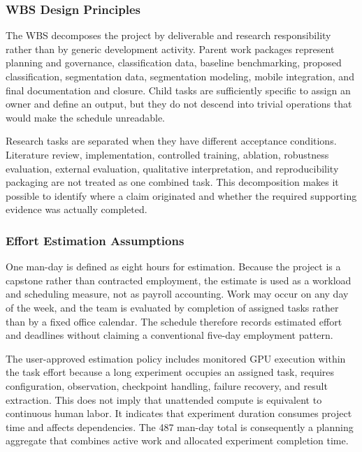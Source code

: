\subsubsection{WBS Design Principles}
The WBS decomposes the project by deliverable and research responsibility rather than by generic development activity. Parent work packages represent planning and governance, classification data, baseline benchmarking, proposed classification, segmentation data, segmentation modeling, mobile integration, and final documentation and closure. Child tasks are sufficiently specific to assign an owner and define an output, but they do not descend into trivial operations that would make the schedule unreadable.\par
Research tasks are separated when they have different acceptance conditions. Literature review, implementation, controlled training, ablation, robustness evaluation, external evaluation, qualitative interpretation, and reproducibility packaging are not treated as one combined task. This decomposition makes it possible to identify where a claim originated and whether the required supporting evidence was actually completed.\par
\subsubsection{Effort Estimation Assumptions}
One man-day is defined as eight hours for estimation. Because the project is a capstone rather than contracted employment, the estimate is used as a workload and scheduling measure, not as payroll accounting. Work may occur on any day of the week, and the team is evaluated by completion of assigned tasks rather than by a fixed office calendar. The schedule therefore records estimated effort and deadlines without claiming a conventional five-day employment pattern.\par
The user-approved estimation policy includes monitored GPU execution within the task effort because a long experiment occupies an assigned task, requires configuration, observation, checkpoint handling, failure recovery, and result extraction. This does not imply that unattended compute is equivalent to continuous human labor. It indicates that experiment duration consumes project time and affects dependencies. The 487 man-day total is consequently a planning aggregate that combines active work and allocated experiment completion time.\par
